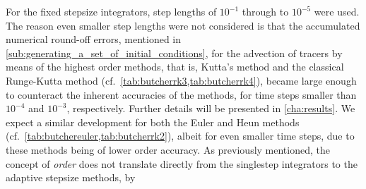 For the fixed stepsize integrators, step lengths of $10^{-1}$ through to
$10^{-5}$ were used. The reason even smaller step lengths were not considered
is that the accumulated numerical round-off errors, mentioned in
\cref{sub:generating_a_set_of_initial_conditions}, for the advection
of tracers by means of the highest order methods, that is, Kutta's method and
the classical Runge-Kutta method (cf.\ \cref{tab:butcherrk3,tab:butcherrk4}),
became large enough to counteract the inherent accuracies of the methods,
for time steps smaller than $10^{-4}$ and $10^{-3}$, respectively. Further
details will be presented in \cref{cha:results}. We expect a similar development
for both the Euler and Heun methods (cf.\
\cref{tab:butchereuler,tab:butcherrk2}), albeit for even smaller time steps,
due to these methods being of lower order accuracy.
%
%
%
As previously mentioned, the concept of \emph{order} does not translate
directly from the singlestep integrators to the adaptive stepsize methods, by
